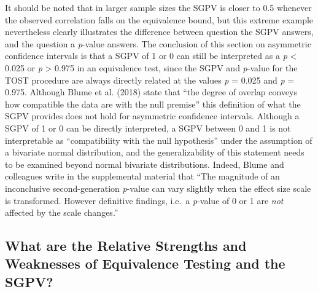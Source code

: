 \documentclass[,man,floatsintext]{apa6}
\begin{document}
It should be noted that in larger sample sizes the SGPV is closer to 0.5 whenever the observed correlation falls on the equivalence bound, but this extreme example nevertheless clearly illustrates the difference between question the SGPV answers, and the question a \emph{p}-value answers. The conclusion of this section on asymmetric confidence intervals is that a SGPV of 1 or 0 can still be interpreted as a \emph{p} \textless{} 0.025 or \emph{p} \textgreater{} 0.975 in an equivalence test, since the SGPV and \emph{p}-value for the TOST procedure are always directly related at the values \emph{p} = 0.025 and \emph{p} = 0.975. Although Blume et al. (2018) state that \enquote{the degree of overlap conveys how compatible the data are with the null premise} this definition of what the SGPV provides does not hold for asymmetric confidence intervals. Although a SGPV of 1 or 0 can be directly interpreted, a SGPV between 0 and 1 is not interpretable as \enquote{compatibility with the null hypothesis} under the assumption of a bivariate normal distribution, and the generalizability of this statement needs to be examined beyond normal bivariate distributions. Indeed, Blume and colleagues write in the supplemental material that \enquote{The magnitude of an inconclusive second-generation \emph{p}-value can vary slightly when the effect size scale is transformed. However definitive findings, i.e.~a \emph{p}-value of 0 or 1 are \emph{not} affected by the scale changes.}

\hypertarget{what-are-the-relative-strengths-and-weaknesses-of-equivalence-testing-and-the-sgpv}{%
\subsection{What are the Relative Strengths and Weaknesses of Equivalence Testing and the SGPV?}\label{what-are-the-relative-strengths-and-weaknesses-of-equivalence-testing-and-the-sgpv}}
\end{document}
